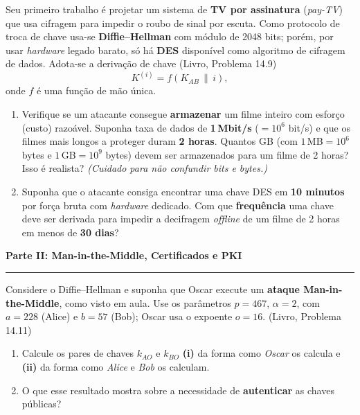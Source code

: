 \documentclass[11pt,a4paper]{article}
\newcommand{\livro}[1]{{\footnotesize\color{black!50}(Livro, Problema #1)}}
\newcommand{\parte}[1]{%
    \par\vspace{1.6em}\noindent
    {\large\bfseries\color{red!55!black}#1}%
    \par\nobreak\vspace{-0.4em}\noindent
    {\color{red!45!black}\rule{\linewidth}{1.0pt}}%
    \par\nobreak\vspace{0.2em}
}
\begin{document}
\begin{exercicio}
Seu primeiro trabalho \'{e} projetar um sistema de \textbf{TV por assinatura} (\textit{pay-TV}) que usa cifragem para impedir o roubo de sinal por escuta. Como protocolo de troca de chave usa-se \textbf{Diffie--Hellman} com m\'{o}dulo de 2048 bits; por\'{e}m, por usar \emph{hardware} legado barato, s\'{o} h\'{a} \textbf{DES} dispon\'{i}vel como algoritmo de cifragem de dados. Adota-se a deriva\c{c}\~{a}o de chave \livro{14.9}
\[
    K^{(i)} = f\!\left(K_{AB} \,\|\, i\right),
\]
onde $f$ \'{e} uma fun\c{c}\~{a}o de m\~{a}o \'{u}nica.
\begin{enumerate}[label=(\alph*)]
    \item Verifique se um atacante consegue \textbf{armazenar} um filme inteiro com esfor\c{c}o (custo) razo\'{a}vel. Suponha taxa de dados de \textbf{1\,Mbit/s} ($=10^6$ bit/s) e que os filmes mais longos a proteger duram \textbf{2 horas}. Quantos GB (com $1\,$MB$=10^6$ bytes e $1\,$GB$=10^9$ bytes) devem ser armazenados para um filme de 2 horas? Isso \'{e} realista? \emph{(Cuidado para n\~{a}o confundir bits e bytes.)}
    \item Suponha que o atacante consiga encontrar uma chave DES em \textbf{10 minutos} por for\c{c}a bruta com \emph{hardware} dedicado. Com que \textbf{frequ\^{e}ncia} uma chave deve ser derivada para impedir a decifragem \emph{offline} de um filme de 2 horas em menos de \textbf{30 dias}?
\end{enumerate}
\end{exercicio}

\parte{Parte II: Man-in-the-Middle, Certificados e PKI}

\begin{exercicio}
Considere o Diffie--Hellman e suponha que Oscar execute um \textbf{ataque Man-in-the-Middle}, como visto em aula. Use os par\^{a}metros $p = 467$, $\alpha = 2$, com $a = 228$ (Alice) e $b = 57$ (Bob); Oscar usa o expoente $o = 16$. \livro{14.11}
\begin{enumerate}[label=(\alph*)]
    \item Calcule os pares de chaves $k_{AO}$ e $k_{BO}$ \textbf{(i)} da forma como \emph{Oscar} os calcula e \textbf{(ii)} da forma como \emph{Alice} e \emph{Bob} os calculam.
    \item O que esse resultado mostra sobre a necessidade de \textbf{autenticar} as chaves p\'{u}blicas?
\end{enumerate}
\end{exercicio}
\end{document}
